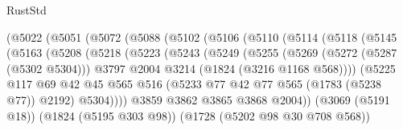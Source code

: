 \begin{lexlean}{RustStd}
\begin{coremodule}
                      (@5022
                        (@5051
                          (@5072
                            (@5088
                              (@5102
                                (@5106
                                  (@5110
                                    (@5114
                                      (@5118
                                        (@5145
                                          (@5163
                                            (@5208
                                              (@5218
                                                (@5223
                                                  (@5243
                                                    (@5249
                                                      (@5255
                                                        (@5269
                                                          (@5272 (@5287 (@5302 @5304)))
                                                          @3797
                                                          @2004
                                                          @3214
                                                          (@1824 (@3216 @1168 @568))))
                                                      (@5225
                                                        @117
                                                        @69
                                                        @42
                                                        @45
                                                        @565
                                                        @516
                                                        (@5233
                                                          @77
                                                          @42
                                                          @77
                                                          @565
                                                          (@1783 (@5238 @77))
                                                          @2192)
                                                        @5304))))
                                                @3859
                                                @3862
                                                @3865
                                                @3868
                                                @2004))
                                            (@3069 (@5191 @18))
                                            (@1824 (@5195 @303 @98))
                                            (@1728 (@5202 @98 @30 @708 @568))

\end{coremodule}
\end{lexlean}

